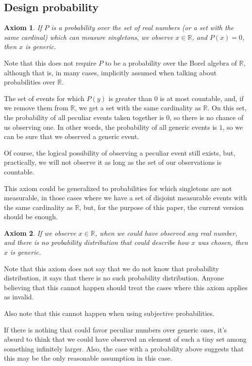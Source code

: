 \documentclass[a4paper
,draft
]{article}
\def\reale{\mathbb{R}}
\newtheorem{axiom}{Axiom}
\begin{document}
\subsection{Design probability}

\begin{axiom}
  If $P$ is a probability over the set of real numbers
  (or a set with the
  same cardinal) which can measure singletons,
  we observe $x\in\reale$, and $P(x)=0$, then $x$ is generic.
\end{axiom}

Note that this does not require $P$ to be a probability over the
Borel algebra of $\reale$, although that is, in many cases, implicitly
assumed when talking about probabilities over $\reale$.

The set of events for which $P(y)$ is
greater than $0$ is at most countable, and, if we remove them from $\reale$, we
get a set with the same cardinality as $\reale$. On this set, the probability
of all peculiar events taken together is $0$, so there is no chance of us
observing one. In other words, the probability of all generic events is $1$,
so we can be sure that we observed a generic event.

Of course, the logical possibility of observing a peculiar event still exists,
but, practically, we will not observe it as long as the set of our
observations is countable.

This axiom could be generalized to probabilities for which singletons are not
measurable, in those cases where we have a set of disjoint measurable events
with the same cardinality as $\reale$, but, for the purpose of this paper,
the current version should be enough.

\begin{axiom}\label{noprobability}
If we observe $x\in\reale$, when we could have
observed any real number, and there is no probability distribution that could
describe how $x$ was chosen, then $x$ is generic.
\end{axiom}

Note that this axiom does not say that we do not know that probability
distribution, it says that there is no such probability distribution.
Anyone believing that this cannot happen should treat the cases where
this axiom applies as invalid.

Also note that this cannot happen when using subjective probabilities.

If there is nothing that could favor
peculiar numbers over generic ones, it's absurd to think that we could have
observed an element of such a tiny set among something infinitely larger.
Also, the case with a probability above suggests that this may be the only
reasonable assumption in this case.
\end{document}
